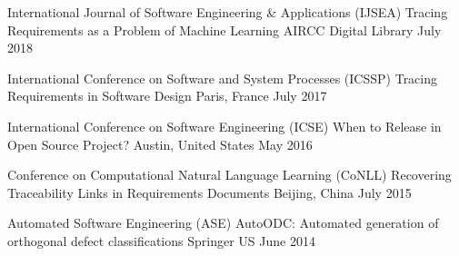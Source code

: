 

\begin{cventries}

  \cventry
    {International Journal of Software Engineering \& Applications (IJSEA)} %
    {Tracing Requirements as a Problem of Machine Learning} %
    {AIRCC Digital Library} %
    {July 2018} %
    {}

  \cventry
    {International Conference on Software and System Processes (ICSSP)} %
    {Tracing Requirements in Software Design} %
    {Paris, France} %
    {July 2017} %
    {}

  \cventry
    {International Conference on Software Engineering (ICSE)} %
    {When to Release in Open Source Project?} %
    {Austin, United States} %
    {May 2016} %
    {}

  \cventry
    {Conference on Computational Natural Language Learning (CoNLL)} %
    {Recovering Traceability Links in Requirements Documents} %
    {Beijing, China} %
    {July 2015} %
    {}

  \cventry
    {Automated Software Engineering (ASE)} %
    {AutoODC: Automated generation of orthogonal defect classifications} %
    {Springer US}
    {June 2014} %
    {}

\end{cventries}
